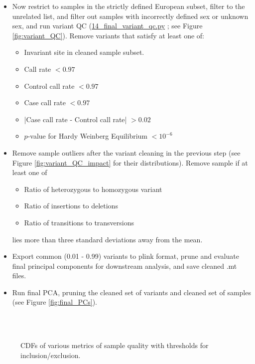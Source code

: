 \documentclass[12pt]{article}
\begin{document}
\begin{itemize}
\begin{enumerate}
	\end{enumerate}
	\item Now restrict to samples in the strictly defined European subset, filter to the unrelated list, and filter out samples with incorrectly defined sex or unknown sex, and run variant QC (\href{https://github.com/astheeggeggs/BipEx/blob/master/scripts_BipEx/QC_BipEx/14_final_variant_qc.py}{14\_final\_variant\_qc.py} ; see Figure \ref{fig:variant_QC}). Remove variants that satisfy at least one of:
	\begin{itemize}
		\item Invariant site in cleaned sample subset.
		\item Call rate $< 0.97$
		\item Control call rate $< 0.97$
		\item Case call rate $< 0.97$
		\item |Case call rate - Control call rate| $> 0.02$
		\item $p$-value for Hardy Weinberg Equilibrium $< 10^{-6}$
	\end{itemize}
	\item Remove sample outliers after the variant cleaning in the previous step (see Figure \ref{fig:variant_QC_impact} for their distributions). Remove sample if at least one of
	\begin{itemize}
		\item Ratio of heterozygous to homozygous variant
		\item Ratio of insertions to deletions
		\item Ratio of transitions to transversions
	\end{itemize} 
	lies more than three standard deviations away from the mean.
	\item Export common (0.01 - 0.99) variants to plink format, prune and evaluate final principal components for downstream analysis, and save cleaned .mt files.
	\item Run final PCA, pruning the cleaned set of variants and cleaned set of samples (see Figure \ref{fig:final_PCs}).
\end{itemize}

\begin{figure}
\centering
{}
\\
\\
\caption{CDFs of various metrics of sample quality with thresholds for inclusion/exclusion.}
\label{fig:initial_sample_qc}
\end{figure}
\end{document}
